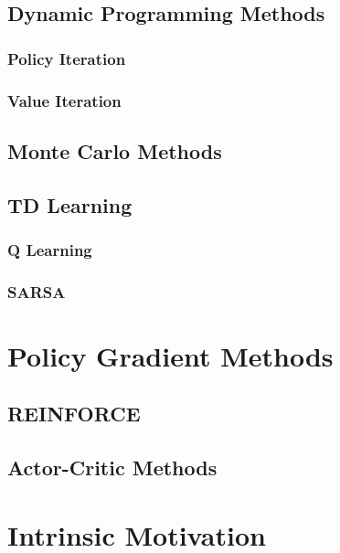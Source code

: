 \subsection{Dynamic Programming Methods}

\subsubsection{Policy Iteration}

\subsubsection{Value Iteration}

\subsection{Monte Carlo Methods}

\subsection{TD Learning}

\subsubsection{Q Learning}

\subsubsection{SARSA}



\section{Policy Gradient Methods}

\subsection{REINFORCE}

\subsection{Actor-Critic Methods}


\section{Intrinsic Motivation}

